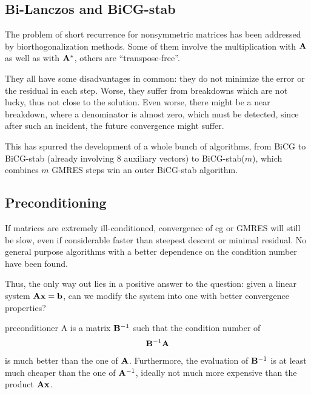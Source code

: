 \subsection{Bi-Lanczos and BiCG-stab}

\begin{intro}
  The problem of short recurrence for nonsymmetric matrices has been
  addressed by biorthogonalization methods. Some of them involve the
  multiplication with $\mathbf A$ as well as with $\mathbf A^*$, others are
  ``transpose-free''.

  They all have some disadvantages in common: they do not minimize the
  error or the residual in each step. Worse, they suffer from
  breakdowns which are not lucky, thus not close to the solution. Even
  worse, there might be a near breakdown, where a denominator is
  almost zero, which must be detected, since after such an incident,
  the future convergence might suffer.

  This has spurred the development of a whole bunch of algorithms,
  from BiCG to BiCG-stab (already involving 8 auxiliary vectors) to
  BiCG-stab($m$), which combines $m$ GMRES steps win an outer
  BiCG-stab algorithm.
\end{intro}

\subsection{Preconditioning}

\begin{intro}
  If matrices are extremely ill-conditioned, convergence of cg or
  GMRES will still be slow, even if considerable faster than steepest
  descent or minimal residual. No general purpose algorithms with a
  better dependence on the condition number have been found.

  Thus, the only way out lies in a positive answer to the question:
  given a linear system $\mathbf A\mathbf x = \mathbf b$, can we modify the system
  into one with better convergence properties?
\end{intro}

\begin{Definition}{preconditioner}
  A  is a matrix $\mathbf B^{-1}$ such that the
  condition number of
  \begin{gather}
    \mathbf B^{-1}\mathbf A
  \end{gather}
  is much better than the one of $\mathbf A$. Furthermore, the evaluation
  of $\mathbf B^{-1}$ is at least much cheaper than the one of
  $\mathbf A^{-1}$, ideally not much more expensive than the product
  $\mathbf A\mathbf x$.
\end{Definition}





